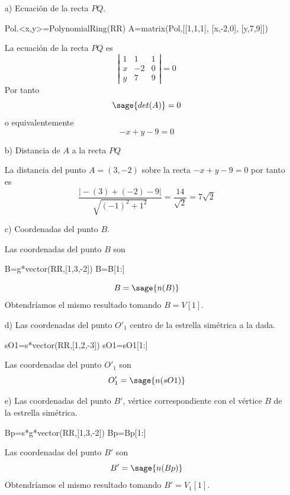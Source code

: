\documentclass{amsart}
\begin{document}
\begin{enumerate} 
\item[a)] Ecuación de la recta $PQ$.

\begin{sageblock}
Pol.<x,y>=PolynomialRing(RR)
A=matrix(Pol,[[1,1,1],
            [x,-2,0],
            [y,7,9]])
\end{sageblock}

La ecuación de la recta $PQ$ es
\[ \left| \begin{array}{rrr}
1 & 1 & 1  \\            
x & -2 & 0  \\          
y & 7 & 9            
\end{array} \right| = 0\] Por tanto \[ \sage{det(A)} = 0 \] o equivalentemente \[ -x + y - 9 = 0 \]

\item[b)] Distancia de $A$ a la recta $PQ$

La distancia del punto $A = (3,-2)$ sobre la recta $-x+y-9=0$ por tanto es \[ \frac{\vert -(3)+ (-2)-9\vert}{\sqrt{(-1)^2+1^2}} = \frac{14}{\sqrt{2}}=7\sqrt{2} \]


\item[c)] Coordenadas del punto $B$.

Las coordenadas del punto $B$ son
\begin{sageblock}
B=g*vector(RR,[1,3,-2])
B=B[1:]
\end{sageblock}
\[ B=\sage{n(B)} \] Obtendríamos el mismo resultado tomando $B=V[1]$.

\item[d)] Las coordenadas del punto $O'_1$ centro de la estrella simétrica a la dada.
 
\begin{sageblock}
sO1=s*vector(RR,[1,2,-3])
sO1=sO1[1:]
\end{sageblock}
Las coordenadas del punto $O'_1$ son
\[ O'_1 = \sage{n(sO1)} \] 

\item[e)] Las coordenadas del punto $B'$, vértice correspondiente con el vértice $B$ de la estrella simétrica.

\begin{sageblock}
Bp=s*g*vector(RR,[1,3,-2])
Bp=Bp[1:]
\end{sageblock}

Las coordenadas del punto $B'$ son
\[ B' = \sage{n(Bp)} \] Obtendríamos el mismo resultado tomando $B'=V_1[1]$.


\end{enumerate}
\end{document}
